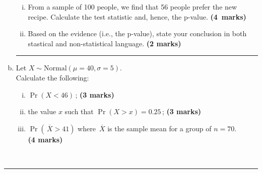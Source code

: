 \documentclass[12pt]{article}
\begin{document}
\begin{enumerate}[a)]
\begin{enumerate}[i)]
    \item From a sample of 100 people, we find that 56 people prefer the new recipe. Calculate the test statistic and, hence, the p-value. \hfill{\mbox{\scriptsize \bf (4 marks)}}
    \item Based on the evidence (i.e., the p-value), state your conclusion in both stastical and non-statistical language. \hfill{\scriptsize \bf (2 marks)}
    \end{enumerate}
    \begin{center}\noindent\rule{0.4\linewidth}{0.5pt}\end{center}
\item Let $X \sim \text{Normal}(\mu = 40, \sigma = 5)$.\\[0.3cm]
    Calculate the following:
    \begin{enumerate}[i)]\itemsep0.3cm
    \item $\Pr(X < 46)$\,; \hfill{\scriptsize \bf (3 marks)}
    \item the value $x$ such that $\Pr(X > x) = 0.25$\,; \hfill{\scriptsize \bf (3 marks)}
    \item $\Pr(\,\overline{\!X} > 41)$ where $\,\overline{\!X}$ is the sample mean for a group of $n=70$.\\
        \phantom{a}\hfill{\scriptsize \bf (4 marks)}
    \end{enumerate}
\end{enumerate}
\quad\\[-0.3cm]
\noindent\rule{\linewidth}{1pt}

\newpage
\end{document}

